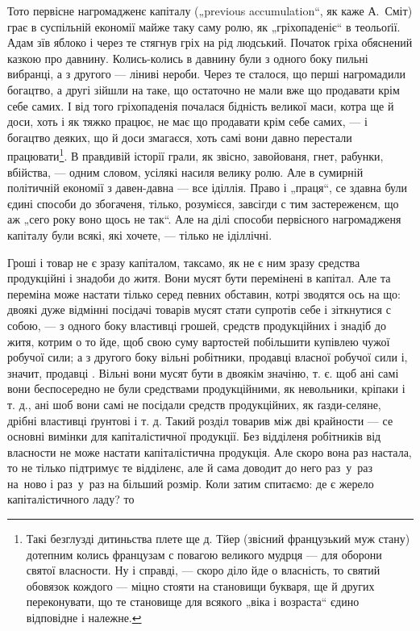 Тото первісне нагромадженє капіталу („previous accumulation“,
як каже А.~Сміт) грає в суспільній економії
майже таку саму ролю, як „гріхопаденіє“ в теольоґії. Адам
зїв яблоко і через те стягнув гріх на рід людський. Початок
гріха обяснений казкою про давнину. Колись-колись
в давнину були з одного боку пильні вибранці, а з другого —
ліниві нероби. Через те сталося, що перші нагромадили
богацтво, а другі зійшли на таке, що остаточно не мали
вже що продавати крім себе самих. І від того гріхопаденія
почалася бідність великої маси, котра ще й доси, хоть і як
тяжко працює, не має що продавати крім себе самих, —
і богацтво деяких, що й доси змагаєся, хоть самі вони
давно перестали працювати\footnote{
Такі безглузді дитиньства плете ще д. Тйер (звісний французький
муж стану) дотепним колись французам с повагою великого мудрця —
для оборони святої власности. Ну і справді, — скоро діло йде о власність,
то святий обовязок кождого — міцно стояти на становищи букваря,
ще й других переконувати, що те становище для всякого „віка
і возраста“ єдино відповідне і належне.
}. В правдивій історії грали, як
звісно, завойованя, гнет, рабунки, вбійства, — одним словом,
усілякі насиля велику ролю. Але в сумирній політичній
економії з давен-давна — все іділлія. Право і „праця“, се
здавна були єдині способи до збогаченя, тілько, розумієся,
завсігди с тим застереженєм, що аж „сего року воно щось
не так“. Але на ділі способи первісного нагромадженя капіталу
були всякі, які хочете, — тілько не іділлічні.

Гроші і товар не є зразу капіталом, таксамо, як не
є ним зразу средства продукційні і знадоби до житя. Вони
мусят бути перемінені в капітал. Але та переміна може настати
тілько серед певних обставин, котрі зводятся ось на
що: двоякі дуже відмінні посідачі товарів мусят стати супротів
себе і зіткнутися с собою, — з одного боку властивці
грошей, средств продукційних і знадіб до житя, котрим
о то йде, щоб свою суму вартостей побільшити купівлею
чужої робучої сили; а з другого боку вільні робітники, продавці
власної робучої сили і, значит, продавці .
Вільні вони мусят бути в двоякім значіню, т. є. щоб ані
самі вони беспосередно не були средствами продукційними,
як невольники, кріпаки і т. д., ані шоб вони самі не посідали
средств продукційних, як ґазди-селяне, дрібні властивці
ґрунтові і т. д. Такий розділ товарив між дві крайности
— се основні вимінки для капіталістичної продукції.
Без відділеня робітників від власности не може настати
капіталістична продукція. Але скоро вона раз настала, то
не тілько підтримує те відділенє, але й сама доводит до
него раз~у~раз на~ново і раз~у~раз на більший розмір. Коли
затим спитаємо: де є жерело капіталістичного ладу? то
\parbreak{}
